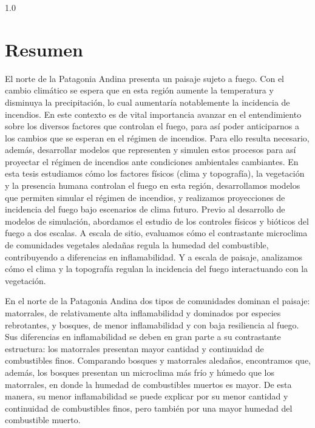 \newpage{\ }
\thispagestyle{empty}

\begin{spacing}{1.0} %

\chapter*{Resumen}

\vspace{.5cm}

El norte de la Patagonia Andina presenta un paisaje sujeto a fuego. Con el cambio climático se espera que en esta región aumente la temperatura y disminuya la precipitación, lo cual aumentaría notablemente la incidencia de incendios. En este contexto es de vital importancia avanzar en el entendimiento sobre los diversos factores que controlan el fuego, para así poder anticiparnos a los cambios que se esperan en el régimen de incendios. Para ello resulta necesario, además, desarrollar modelos que representen y simulen estos procesos para así proyectar el régimen de incendios ante condiciones ambientales cambiantes. En esta tesis estudiamos cómo los factores físicos (clima y topografía), la vegetación y la presencia humana controlan el fuego en esta región, desarrollamos modelos que permiten simular el régimen de incendios, y realizamos proyecciones de incidencia del fuego bajo escenarios de clima futuro. Previo al desarrollo de modelos de simulación, abordamos el estudio de los controles físicos y bióticos del fuego a dos escalas. A escala de sitio, evaluamos cómo el contrastante microclima de comunidades vegetales aledañas regula la humedad del combustible, contribuyendo a diferencias en inflamabilidad. Y a escala de paisaje, analizamos cómo el clima y la topografía regulan la incidencia del fuego interactuando con la vegetación.

En el norte de la Patagonia Andina dos tipos de comunidades dominan el paisaje: matorrales, de relativamente alta inflamabilidad y dominados por especies rebrotantes, y bosques, de menor inflamabilidad y con baja resiliencia al fuego. Sus diferencias en inflamabilidad se deben en gran parte a su contrastante estructura: los matorrales presentan mayor cantidad y continuidad de combustibles finos. Comparando bosques y matorrales aledaños, encontramos que, además, los bosques presentan un microclima más frío y húmedo que los matorrales, en donde la humedad de combustibles muertos es mayor. De esta manera, su menor inflamabilidad se puede explicar por su menor cantidad y continuidad de combustibles finos, pero también por una mayor humedad del combustible muerto. 


\end{spacing}

